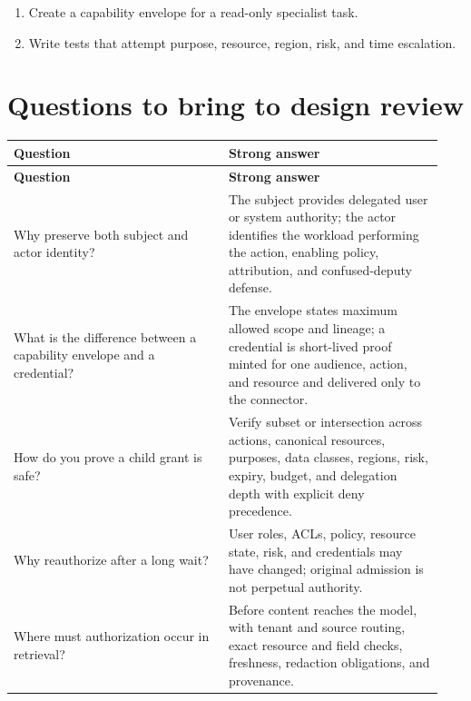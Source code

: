 \begin{enumerate}

\item Create a capability envelope for a read-only specialist task.

\item Write tests that attempt purpose, resource, region, risk, and time escalation.

\end{enumerate}

\section{Questions to bring to design review}

\BookTableStart
\small
\begin{longtable}{@{}Y{0.4700\linewidth}Y{0.4700\linewidth}@{}}
\color{white}\bfseries \textbf{Question} & \color{white}\bfseries \textbf{Strong answer} \\
\endfirsthead
{}
\color{white}\bfseries \textbf{Question} & \color{white}\bfseries \textbf{Strong answer} \\
\endhead
Why preserve both subject and actor identity? & The subject provides delegated user or system authority; the actor identifies the workload performing the action, enabling policy, attribution, and confused-deputy defense. \\
What is the difference between a capability envelope and a credential? & The envelope states maximum allowed scope and lineage; a credential is short-lived proof minted for one audience, action, and resource and delivered only to the connector. \\
How do you prove a child grant is safe? & Verify subset or intersection across actions, canonical resources, purposes, data classes, regions, risk, expiry, budget, and delegation depth with explicit deny precedence. \\
Why reauthorize after a long wait? & User roles, ACLs, policy, resource state, risk, and credentials may have changed; original admission is not perpetual authority. \\
Where must authorization occur in retrieval? & Before content reaches the model, with tenant and source routing, exact resource and field checks, freshness, redaction obligations, and provenance. \\
\end{longtable}
\BookTableEnd

